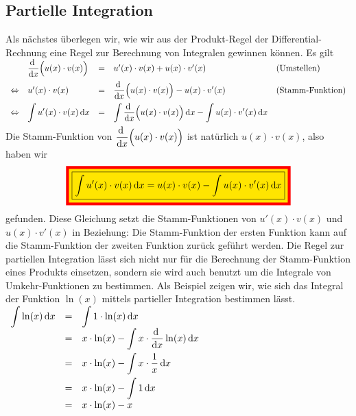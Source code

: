 \subsection{Partielle Integration}
Als n\"achstes \"uberlegen wir, wie wir aus der Produkt-Regel der Differential-Rechnung
eine Regel zur Berechnung von Integralen gewinnen k\"onnen.  Es gilt
\\[0.2cm]
$
\begin{array}[t]{llcll}
                & \displaystyle\frac{\textrm{d}\;}{\textrm{d}x} \Bigl(u(x)\cdot v(x)\Bigr)  & = & u'(x)\cdot  v(x) + u(x) \cdot  v'(x) &\mbox{(Umstellen)} \\[0.3cm]
\Leftrightarrow & u'(x) \cdot  v(x) & = & \displaystyle\frac{\textrm{d}\;}{\textrm{d}x} \Bigl(u(x)\cdot v(x)\Bigr) - u(x) \cdot  v'(x) &\mbox{(Stamm-Funktion)} \\[0.3cm]
\Leftrightarrow & \displaystyle \int u'(x)\cdot  v(x)\,\textrm{d} x & = & \displaystyle\int\displaystyle\frac{\textrm{d}\;}{\textrm{d}x} \Bigl(u(x)\cdot v(x)\Bigr)\,\textrm{d} x - \int u(x) \cdot  v'(x)\,\textrm{d} x \\[0.3cm]
\end{array}
$
\\[0.2cm]
Die Stamm-Funktion von $\displaystyle\frac{\textrm{d}\;}{\textrm{d}x}\Bigl( u(x)\cdot v(x) \Bigr)$ ist nat\"urlich $u(x)\cdot v(x)$, also haben wir
\begin{equation}
  \label{eq:partInt0}
 \colorbox{red}{\colorbox{orange}{\framebox{$\ds\int u'(x)\cdot  v(x)\,\dr x =  \ds u(x)\cdot v(x) - \int u(x) \cdot  v'(x)\,\dr x$}}}
\end{equation}
gefunden. Diese Gleichung setzt die Stamm-Funktionen von $u'(x)\cdot  v(x)$
und $u(x) \cdot  v'(x)$ in Beziehung: Die Stamm-Funktion der ersten Funktion kann auf die
Stamm-Funktion der zweiten Funktion zur\"uck gef\"uhrt werden.
Die Regel zur partiellen Integration l\"asst sich nicht nur f\"ur die Berechnung der
Stamm-Funktion eines Produkts einsetzen, sondern sie wird auch benutzt um die Integrale von
Umkehr-Funktionen zu bestimmen.  Als Beispiel zeigen wir, wie sich das Integral der 
Funktion $\ln(x)$ mittels partieller Integration bestimmen l\"asst.
\\[0.3cm]
\hspace*{1.3cm}
$
\begin{array}[t]{lcl}
 \displaystyle\int\ln(x)\,\textrm{d} x & = &  \displaystyle\int1\cdot \ln(x)\,\textrm{d} x \\[0.2cm]
                 & = &  x\cdot \ln(x) - \displaystyle\int x\cdot \displaystyle\frac{\textrm{d}\;}{\textrm{d}x} \ln(x)\,\textrm{d} x \\[0.3cm]
                 & = &  x\cdot \ln(x) - \displaystyle\int x\cdot \frac{1}{x}\,\textrm{d} x \\[0.3cm]
                 & = &  x\cdot \ln(x) - \displaystyle\int 1\,\textrm{d} x \\[0.2cm]
                 & = &  x\cdot \ln(x) - x \\[0.2cm]
\end{array}
$


